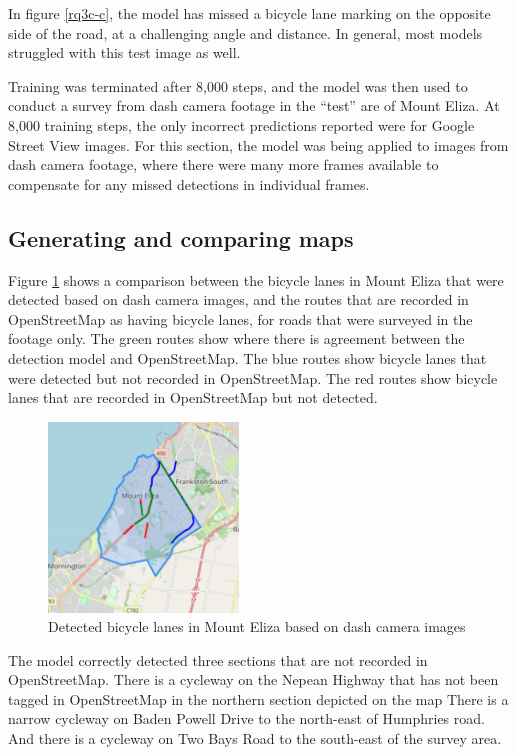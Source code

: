 \documentclass[11pt,twoside]{report}
\begin{document}
In figure \ref{rq3c-c}, the model has missed a bicycle lane marking on the opposite side of the road, at a challenging angle and distance.  In general, most models struggled with this test image as well.

Training was terminated after 8,000 steps, and the model was then used to conduct a survey from dash camera footage in the ``test'' are of Mount Eliza.  At 8,000 training steps, the only incorrect predictions reported were for Google Street View images.  For this section, the model was being applied to images from dash camera footage, where there were many more frames available to compensate for any missed detections in individual frames.


\subsection{Generating and comparing maps}

Figure \ref{fig:rq3} shows a comparison between the bicycle lanes in Mount Eliza that were detected based on dash camera images, and the routes that are recorded in OpenStreetMap as having bicycle lanes, for roads that were surveyed in the footage only.  The green routes show where there is agreement between the detection model and OpenStreetMap.  The blue routes show bicycle lanes that were detected but not recorded in OpenStreetMap.  The red routes show bicycle lanes that are recorded in OpenStreetMap but not detected.

\begin{figure}[h]
\centering
\includegraphics[width=0.45\textwidth]{map2_3.png}
\caption{Detected bicycle lanes in Mount Eliza based on dash camera images}
\label{fig:rq3}
\end{figure}

The model correctly detected three sections that are not recorded in OpenStreetMap.  There is a cycleway on the Nepean Highway that has not been tagged in OpenStreetMap in the northern section depicted on the map  There is a narrow cycleway on Baden Powell Drive to the north-east of Humphries road.  And there is a cycleway on Two Bays Road to the south-east of the survey area.
\end{document}
